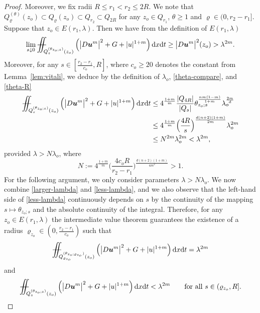 \documentclass[a4paper, 10pt, american]{amsart}
\numberwithin{theorem}{section}
\numberwithin{equation}{section}
\newcommand{\dxdt}{\,\mathrm{d}x\mathrm{d}t}
\renewcommand{\rho}{\varrho}
\newcommand{\power}[2]{\bm{#1^{\mbox{\unboldmath{\scriptsize$#2$}}}}}
\def\Xiint#1{\mathchoice
    {\XXiint\displaystyle\textstyle{#1}}%
    {\XXiint\textstyle\scriptstyle{#1}}%
    {\XXiint\scriptstyle\scriptscriptstyle{#1}}%
    {\XXiint\scriptscriptstyle\scriptscriptstyle{#1}}%
    \!\iint}
\def\XXiint#1#2#3{\setbox0=\hbox{$#1{#2#3}{\iint}$}
    \vcenter{\hbox{$#2#3$}}\kern-0.5\wd0}
\def\biint{\Xiint{-\!-}}
\begin{document}
\begin{proof}
Moreover, we fix radii $R\le r_1<r_2\le 2R$.
We note that 
$
	Q_\rho^{(\theta)}(z_o) \subset Q_\rho (z_o) \subset Q_{r_2}\subset Q_{2R}
$
for any $z_o\in Q_{r_1}$, $\theta\ge1$ and $\rho\in(0,r_2-r_1]$.
Suppose that $z_o\in E(r_1,\lambda)$. Then we have from the definition of $E(r_1,\lambda)$
\begin{equation}\label{larger-lambda}
	\lim_{s\downarrow 0} 
	\biint_{Q_{s}^{(\theta_{z_o;s})}(z_o)} 
	\Big(\big|D\power{u}{m}\big|^2 + G+|u|^{1+m} \Big) 
	\dxdt
	\ge
	\big|D\power{u}{m}\big|^2(z_o)
	>
	\lambda^{2m}.
\end{equation}
Moreover, for any $s\in[\frac{r_2-r_1}{c_o},R]$, where $c_o\ge20$
denotes the constant from Lemma~\ref{lem:vitali}, we deduce by the
definition of $\lambda_o$, \eqref{theta-compare}, and \eqref{theta-R}
\begin{align}\label{less-lambda}
\nonumber
	\biint_{Q_{s}^{(\theta_{z_o;s})}(z_o)} 
	\Big(\big|D\power{u}{m}\big|^2 + G+|u|^{1+m}\Big)\dxdt
	&\le
	4^\frac{1+m}m\frac{|Q_{4R}|}{|Q_{s}|}\theta_{z_o;s}^{\frac{nm(1-m)}{1+m}}
	\lambda_o^\frac{2m}d \\\nonumber
	&\le
	4^\frac{1+m}m\Big(\frac{4R}{s}\Big)^\frac{d(n+2)(1+m)}{2m}
	\lambda_o^{2m} \\
	&\le
	N^{2m} \lambda_o^{2m} 
	<
	\lambda^{2m},
\end{align}
provided $\lambda>N\lambda_o$,
where
\begin{equation}\label{choice_lambda}
	N
	:=
	4^\frac{1+m}m\Big(\frac{4 c_o R}{r_2-r_1}\Big)^{\frac{d(n+2)(1+m)}{4m^2}}
	>1.
\end{equation}
For the following argument, we only consider parameters $\lambda>N\lambda_o$.
We now combine \eqref{larger-lambda} and \eqref{less-lambda}, and we
also observe that the left-hand side of \eqref{less-lambda}
continuously depends on $s$ by the continuity of the mapping
$s\mapsto\theta_{z_o;s}$ and the absolute continuity of the
integral. Therefore, for any $z_o\in E(r_1,\lambda)$
the intermediate value theorem guarantees the
existence of a radius $\rho_{z_o} \in(0, \frac{r_2-r_1}{c_o})$ such that
\begin{align}\label{=lambda}
	\biint_{Q_{\rho_{z_o}}^{(\theta_{z_o;\rho_{z_o}})}(z_o)} 
	\Big(\big|D\power{u}{m}\big|^2 + G+|u|^{1+m}\Big) \dxdt
	=
	\lambda^{2m}
\end{align}
and
\begin{align}\label{<lambda}
	\biint_{Q_{s}^{(\theta_{z_o;s})}(z_o)} 
	\Big(\big|D\power{u}{m}\big|^2 + G+|u|^{1+m}\Big) \dxdt
	<
	\lambda^{2m}
	\qquad
	\mbox{for all $s\in (\rho_{z_o}, R]$.}

\end{align}
\end{proof}
\end{document}
